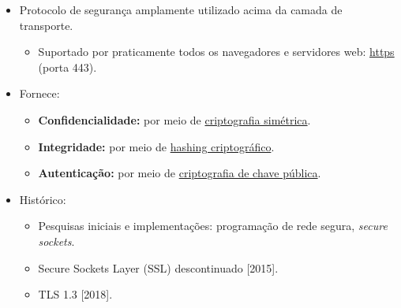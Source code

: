     \begin{itemize}[left=0.5cm, align=left, nosep]
        \item Protocolo de segurança amplamente utilizado acima da camada de transporte.
        \begin{itemize}[left=0.5cm, nosep, label=$\hookrightarrow$]
            \item Suportado por praticamente todos os navegadores e servidores web: \underline{https} (porta 443).
        \end{itemize}
        \item Fornece:
        \begin{itemize}[left=0.5cm, nosep, label=$\hookrightarrow$]
            \item \textbf{Confidencialidade:} por meio de \underline{criptografia simétrica}.
            \item \textbf{Integridade:} por meio de \underline{hashing criptográfico}.
            \item \textbf{Autenticação:} por meio de \underline{criptografia de chave pública}.
        \end{itemize}
        \item Histórico:
        \begin{itemize}[left=0.5cm, nosep, label=$\hookrightarrow$]
            \item Pesquisas iniciais e implementações: programação de rede segura, \textit{secure sockets}.
            \item Secure Sockets Layer (SSL) descontinuado [2015].
            \item TLS 1.3 [2018].
        \end{itemize}
    \end{itemize}    

